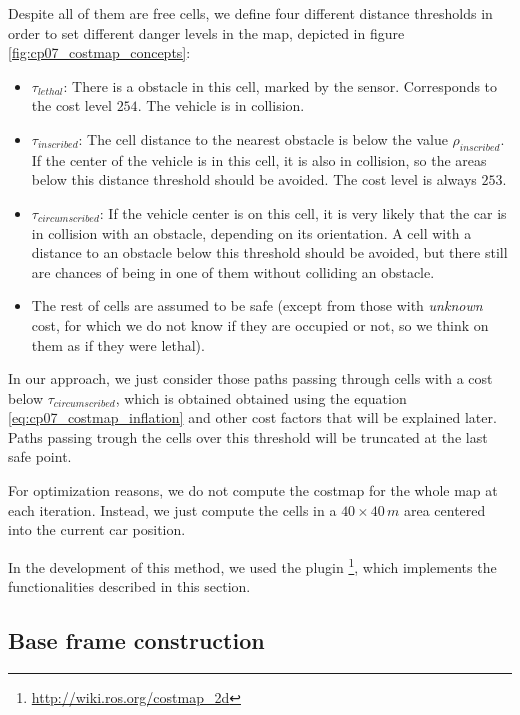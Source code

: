 Despite all of them are free cells, we define four different distance thresholds in order to set different danger levels in the map, depicted in figure \ref{fig:cp07_costmap_concepts}:

\begin{itemize}
 \item $\tau_{lethal}$: There is a obstacle in this cell, marked by the sensor. Corresponds to the cost level $254$. The vehicle is in collision.
 \item $\tau_{inscribed}$: The cell distance to the nearest obstacle is below the value $\rho_{inscribed}$. If the center of the vehicle is in this cell, it is also in collision, so the areas below this distance threshold should be avoided. The cost level is always $253$.
 \item $\tau_{circumscribed}$: If the vehicle center is on this cell, it is very likely that the car is in collision with an obstacle, depending on its orientation. A cell with a distance to an obstacle below this threshold should be avoided, but there still are chances of being in one of them without colliding an obstacle. 
 \item The rest of cells are assumed to be safe (except from those with \emph{unknown} cost, for which we do not know if they are occupied or not, so we think on them as if they were lethal).
\end{itemize}

In our approach, we just consider those paths passing through cells with a cost below $\tau_{circumscribed}$, which is obtained obtained using the equation \ref{eq:cp07_costmap_inflation} and other cost factors that will be explained later. Paths passing trough the cells over this threshold will be truncated at the last safe point.

For optimization reasons, we do not compute the costmap for the whole map at each iteration. Instead, we just compute the cells in a $40 \times 40\,m$ area centered into the current car position. 

In the development of this method, we used the \ROS plugin \footnote{\url{http://wiki.ros.org/costmap\_2d}}, which implements the functionalities described in this section. 

\subsection{Base frame construction}\label{ch:chapter07_01_02}

